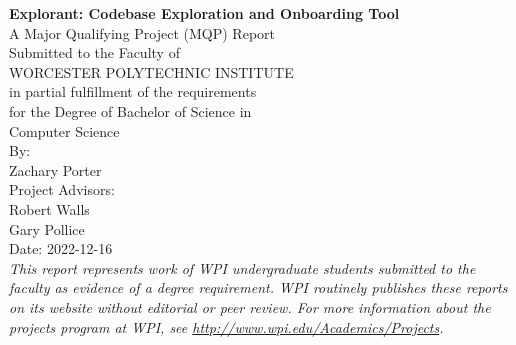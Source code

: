 
 



\begin{center}
    \Huge{\textbf{Explorant: Codebase Exploration and Onboarding Tool}} \\ %
    \vspace{10mm} %
    \large{
    A Major Qualifying Project (MQP) Report \\
    Submitted to the Faculty of \\
    WORCESTER POLYTECHNIC INSTITUTE \\
    in partial fulfillment of the requirements \\
    for the Degree of Bachelor of Science in \\
    } %
    \Large{
    \vspace{5mm} %
    Computer Science \\ %
    \vspace{10mm} %
    By: \\
    \vspace{5mm} %
    Zachary Porter \\ %
    \vspace {15mm} %
    Project Advisors: \\ %
    \vspace{5mm} %
    Robert Walls \\ %
    Gary Pollice \\  %
    \vspace {15mm} %
    Date: 2022-12-16 \\ %
    }
    \vspace{10mm} %
    \large{\textit{This report represents work of WPI undergraduate students submitted to the faculty as evidence of a degree requirement. WPI routinely publishes these reports on its website without editorial or peer review. For more information about the projects program at WPI, see \url{http://www.wpi.edu/Academics/Projects}.}} %
\end{center}

